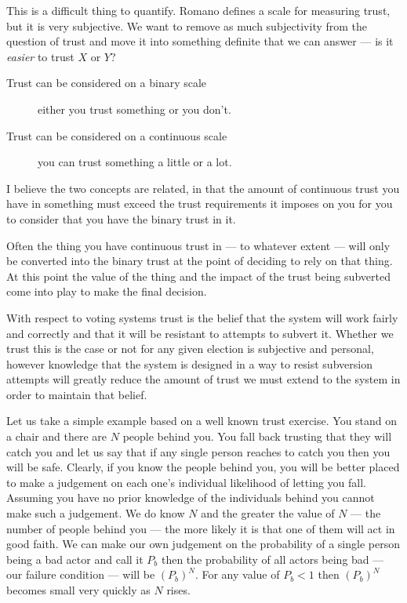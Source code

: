 This is a difficult thing to quantify. Romano \cite{romanoNatureTrustConceptual2003} defines a scale for measuring trust, but it is very subjective. We want to remove as much subjectivity from the question of trust and move it into something definite that we can answer --- is it \emph{easier} to trust $X$ or $Y$?

\begin{description}
    \item[Trust can be considered on a binary scale] either you trust something or you don't.
    \item[Trust can be considered on a continuous scale] you can trust something a little or a lot.
\end{description}

I believe the two concepts are related, in that the amount of continuous trust you have in something must exceed the trust requirements it imposes on you for you to consider that you have the binary trust in it.

Often the thing you have continuous trust in --- to whatever extent --- will only be converted into the binary trust at the point of deciding to rely on that thing. At this point the value of the thing and the impact of the trust being subverted come into play to make the final decision.

With respect to voting systems trust is the belief that the system will work fairly and correctly and that it will be resistant to attempts to subvert it. Whether we trust this is the case or not for any given election is subjective and personal, however knowledge that the system is designed in a way to resist subversion attempts will greatly reduce the amount of trust we must extend to the system in order to maintain that belief.

Let us take a simple example based on a well known trust exercise. You stand on a chair and there are $N$ people behind you. You fall back trusting that they will catch you and let us say that if any single person reaches to catch you then you will be safe. Clearly, if you know the people behind you, you will be better placed to make a judgement on each one's individual likelihood of letting you fall. Assuming you have no prior knowledge of the individuals behind you cannot make such a judgement. We do know $N$ and the greater the value of $N$ --- the number of people behind you --- the more likely it is that one of them will act in good faith. We can make our own judgement on the probability of a single person being a bad actor and call it $P_b$ then the probability of all actors being bad --- our failure condition --- will be $(P_b)^N$. For any value of $P_b < 1$ then $(P_b)^N$ becomes small very quickly as $N$ rises.

